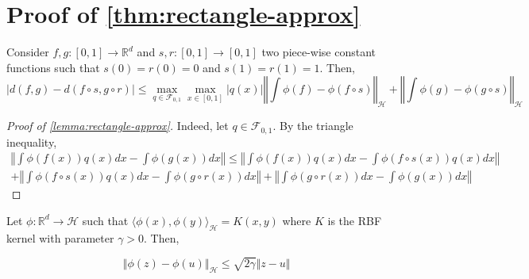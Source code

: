 
\section{Proof of \cref{thm:rectangle-approx}}
\begin{lemma}\label{lemma:rectangle-approx}
Consider $f, g:[0, 1] \to \mathbb R^d$ and $s, r:[0,1] \to[0,1]$ two piece-wise constant functions such that $s(0)=r(0)=0$ and $s(1)=r(1)=1$. Then,
\begin{equation}
    \vert d(f, g) - d(f \circ s, g\circ r) \vert \leq \max_{q\in\mathcal F_{0,1}}\max_{x\in[0,1]}\vert q(x) \vert \left\Vert \int \phi(f) - \phi(f\circ s)\right\Vert_{\mathcal H} + \left\Vert \int \phi(g)- \phi(g\circ s)\right\Vert_\mathcal H
\end{equation}

\end{lemma}
\begin{proof}[Proof of \cref{lemma:rectangle-approx}]
Indeed, let $q\in\mathcal F_{0,1}$. By the triangle inequality,
\begin{align}
\left\Vert \int \phi(f(x))q(x)dx - \int \phi(g(x))dx \right\Vert
\leq
\left\Vert \int \phi(f(x))q(x)dx - \int \phi(f\circ s(x))q(x)dx \right\Vert\\
+ \left\Vert \int \phi(f\circ s(x))q(x)dx - \int \phi(g\circ r(x))dx \right\Vert
+ \left\Vert \int \phi(g\circ r(x))dx - \int \phi(g(x))dx \right\Vert
\end{align}
\end{proof}

\begin{lemma}
Let $\phi:\mathbb R^d \to \mathcal H$ such that $\langle
\phi(x), \phi(y)\rangle_\mathcal H = K(x, y)$ where $K$ is the RBF kernel with parameter $\gamma > 0$. Then,

\begin{equation}
\left\Vert \phi(z) - \phi(u)\right\Vert_\mathcal H \leq \sqrt{2\gamma} \Vert z - u \Vert
\end{equation}
\end{lemma}

